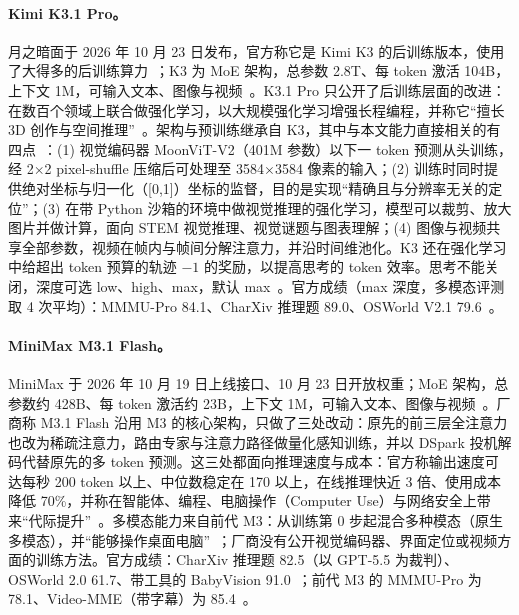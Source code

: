 \documentclass[11pt,a4paper,fontset=none]{ctexart}
\newcommand{\kimi}{Kimi K3.1 Pro}
\newcommand{\mini}{MiniMax M3.1 Flash}
\begin{document}
\paragraph{\kimi。}月之暗面于 2026 年 10 月 23 日发布，官方称它是 Kimi K3 的后训练版本，使用了大得多的后训练算力~\cite{kimik31}；K3 为 MoE 架构，总参数 2.8T、每 token 激活 104B，上下文 1M，可输入文本、图像与视频~\cite{kimik3}。K3.1 Pro 只公开了后训练层面的改进：在数百个领域上联合做强化学习，以大规模强化学习增强长程编程，并称它“擅长 3D 创作与空间推理”~\cite{kimik31}。架构与预训练继承自 K3，其中与本文能力直接相关的有四点~\cite{kimik3}：(1) 视觉编码器 MoonViT-V2（401M 参数）以下一 token 预测从头训练，经 2$\times$2 pixel-shuffle 压缩后可处理至 3584$\times$3584 像素的输入；(2) 训练时同时提供绝对坐标与归一化（[0,1]）坐标的监督，目的是实现“精确且与分辨率无关的定位”；(3) 在带 Python 沙箱的环境中做视觉推理的强化学习，模型可以裁剪、放大图片并做计算，面向 STEM 视觉推理、视觉谜题与图表理解；(4) 图像与视频共享全部参数，视频在帧内与帧间分解注意力，并沿时间维池化。K3 还在强化学习中给超出 token 预算的轨迹 $-1$ 的奖励，以提高思考的 token 效率。思考不能关闭，深度可选 low、high、max，默认 max~\cite{kimiquick}。官方成绩（max 深度，多模态评测取 4 次平均）：MMMU-Pro 84.1、CharXiv 推理题 89.0、OSWorld V2.1 79.6~\cite{kimik31}。

\paragraph{\mini。}MiniMax 于 2026 年 10 月 19 日上线接口、10 月 23 日开放权重；MoE 架构，总参数约 428B、每 token 激活约 23B，上下文 1M，可输入文本、图像与视频~\cite{minimaxm31}。厂商称 M3.1 Flash 沿用 M3 的核心架构，只做了三处改动：原先的前三层全注意力也改为稀疏注意力，路由专家与注意力路径做量化感知训练，并以 DSpark 投机解码代替原先的多 token 预测。这三处都面向推理速度与成本：官方称输出速度可达每秒 200 token 以上、中位数稳定在 170 以上，在线推理快近 3 倍、使用成本降低 70\%，并称在智能体、编程、电脑操作（Computer Use）与网络安全上带来“代际提升”~\cite{minimaxm31}。多模态能力来自前代 M3：从训练第 0 步起混合多种模态（原生多模态），并“能够操作桌面电脑”~\cite{minimaxm3}；厂商没有公开视觉编码器、界面定位或视频方面的训练方法。官方成绩：CharXiv 推理题 82.5（以 GPT-5.5 为裁判）、OSWorld 2.0 61.7、带工具的 BabyVision 91.0~\cite{minimaxm31}；前代 M3 的 MMMU-Pro 为 78.1、Video-MME（带字幕）为 85.4~\cite{minimaxm3}。
\end{document}
